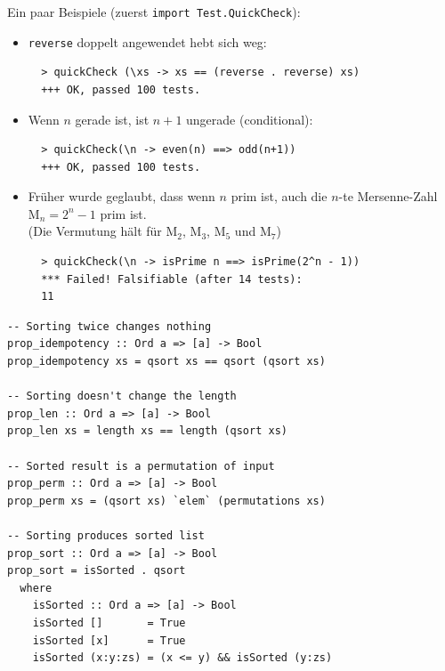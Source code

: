 \documentclass{beamer}
\begin{document}
\begin{frame}[fragile]

Ein paar Beispiele (zuerst \texttt{import Test.QuickCheck}):

\begin{itemize}
\item \texttt{reverse} doppelt angewendet hebt sich weg:
  \begin{verbatim}
  > quickCheck (\xs -> xs == (reverse . reverse) xs)
  +++ OK, passed 100 tests.
  \end{verbatim}
  \pause
\item Wenn $n$ gerade ist, ist $n+1$ ungerade (conditional):
  \begin{verbatim}
  > quickCheck(\n -> even(n) ==> odd(n+1))
  +++ OK, passed 100 tests.
  \end{verbatim}
  \pause
\item Früher wurde geglaubt, dass wenn $n$ prim ist, auch die $n$-te Mersenne-Zahl $\mathrm{M}_n = 2^n - 1$ prim ist.\\ (Die Vermutung hält für $\mathrm{M}_2$, $\mathrm{M}_3$, $\mathrm{M}_5$ und $\mathrm{M}_7$)
  \begin{verbatim}
  > quickCheck(\n -> isPrime n ==> isPrime(2^n - 1))
  *** Failed! Falsifiable (after 14 tests):                  
  11
  \end{verbatim}
\end{itemize}

\end{frame}


\begin{frame}[fragile]

\begin{verbatim}
-- Sorting twice changes nothing
prop_idempotency :: Ord a => [a] -> Bool
prop_idempotency xs = qsort xs == qsort (qsort xs)

-- Sorting doesn't change the length
prop_len :: Ord a => [a] -> Bool
prop_len xs = length xs == length (qsort xs)

-- Sorted result is a permutation of input
prop_perm :: Ord a => [a] -> Bool
prop_perm xs = (qsort xs) `elem` (permutations xs)

-- Sorting produces sorted list
prop_sort :: Ord a => [a] -> Bool
prop_sort = isSorted . qsort
  where
    isSorted :: Ord a => [a] -> Bool
    isSorted []       = True
    isSorted [x]      = True
    isSorted (x:y:zs) = (x <= y) && isSorted (y:zs)
\end{verbatim}

\end{frame}
\end{document}
